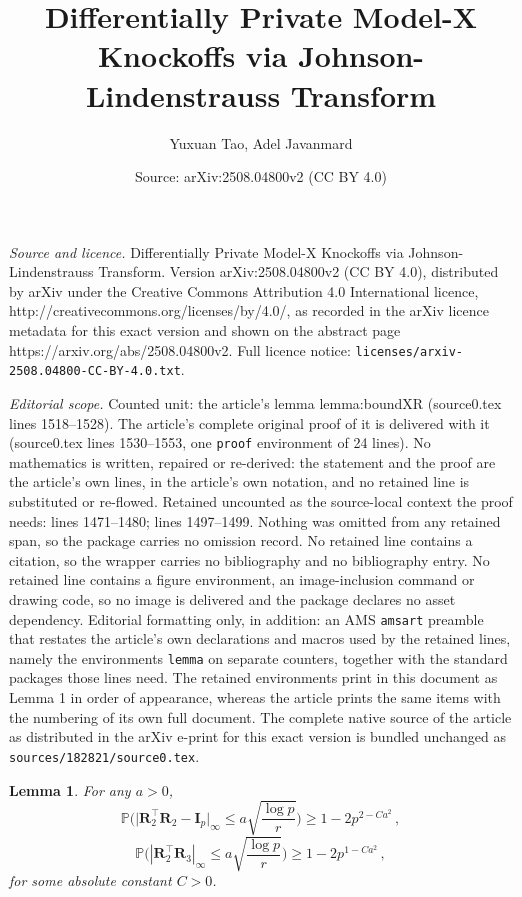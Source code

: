 \documentclass[10pt,a4paper]{amsart}
\title{Differentially Private Model-X Knockoffs via Johnson-Lindenstrauss Transform}
\author{Yuxuan Tao, Adel Javanmard}
\date{Source: arXiv:2508.04800v2 (CC BY 4.0)}
\newtheorem{lemma}{Lemma}
\newcommand{\Prob}{\mathbb{P}}
\newcommand{\bI}{\boldsymbol{I}}
\newcommand{\bR}{\boldsymbol{R}}
\begin{document}
\maketitle

\noindent\emph{Source and licence.} Differentially Private Model-X Knockoffs via Johnson-Lindenstrauss Transform. Version arXiv:2508.04800v2 (CC BY 4.0), distributed by arXiv under the Creative Commons Attribution 4.0 International licence, http://creativecommons.org/licenses/by/4.0/, as recorded in the arXiv licence metadata for this exact version and shown on the abstract page https://arxiv.org/abs/2508.04800v2. Full licence notice: \texttt{licenses/arxiv-2508.04800-CC-BY-4.0.txt}.\par\smallskip

\noindent\textit{Editorial scope.} Counted unit: the article's lemma lemma:boundXR (source0.tex lines 1518--1528). The article's complete original proof of it is delivered with it (source0.tex lines 1530--1553, one \texttt{proof} environment of 24 lines). No mathematics is written, repaired or re-derived: the statement and the proof are the article's own lines, in the article's own notation, and no retained line is substituted or re-flowed.  Retained uncounted as the source-local context the proof needs: lines 1471--1480; lines 1497--1499.  Nothing was omitted from any retained span, so the package carries no omission record.  No retained line contains a citation, so the wrapper carries no bibliography and no bibliography entry.  No retained line contains a figure environment, an image-inclusion command or drawing code, so no image is delivered and the package declares no asset dependency.  Editorial formatting only, in addition: an AMS \texttt{amsart} preamble that restates the article's own declarations and macros used by the retained lines, namely the environments \texttt{lemma} on separate counters, together with the standard packages those lines need.  The retained environments print in this document as Lemma 1 in order of appearance, whereas the article prints the same items with the numbering of its own full document.  The complete native source of the article as distributed in the arXiv e-print for this exact version is bundled unchanged as \texttt{sources/182821/source0.tex}.
\begin{lemma}\label{lemma:boundR}
    For any $a >0$, 
    \begin{equation}\label{eq:boundR1}
        \Prob\bigg(\big|\bR_2^\top \bR_2 -\bI_p\big|_\infty\leq a\sqrt{\frac{\log p}{r}}\bigg)\geq 1- 2 p^{2-Ca^2}\,,
    \end{equation}
    \begin{equation}\label{eq:boundR2}
        \Prob\bigg(|\bR_2^\top \bR_3|_\infty\leq a\sqrt{\frac{\log p}{r}}\bigg)\geq 1- 2 p^{1-Ca^2}\,,
    \end{equation}
    for some absolute constant $C>0$.
\end{lemma}
\end{document}
